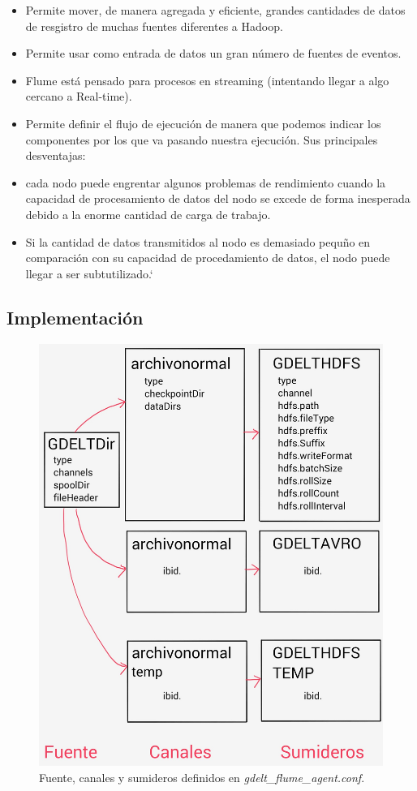 \documentclass[]{article}
\begin{document}
\begin{itemize}
\itemsep1pt\parskip0pt
\item
  Permite mover, de manera agregada y eficiente, grandes cantidades de
  datos de resgistro de muchas fuentes diferentes a Hadoop.
\item
  Permite usar como entrada de datos un gran número de fuentes de
  eventos.
\item
  Flume está pensado para procesos en streaming (intentando llegar a
  algo cercano a Real-time).
\item
  Permite definir el flujo de ejecución de manera que podemos indicar
  los componentes por los que va pasando nuestra ejecución. Sus
  principales desventajas:
\item
  cada nodo puede engrentar algunos problemas de rendimiento cuando la
  capacidad de procesamiento de datos del nodo se excede de forma
  inesperada debido a la enorme cantidad de carga de trabajo.
\item
  Si la cantidad de datos transmitidos al nodo es demasiado pequño en
  comparación con su capacidad de procedamiento de datos, el nodo puede
  llegar a ser subtutilizado.`
\end{itemize}

\subsection{Implementación}\label{implementacion-1}

\begin{figure}[H]
\centering
\includegraphics[width=0.8 \textwidth]{img/flume.jpg}
\caption{Fuente, canales y sumideros definidos en \emph{gdelt\_flume\_agent.conf}.}
\label{flume}
\end{figure}
\end{document}
